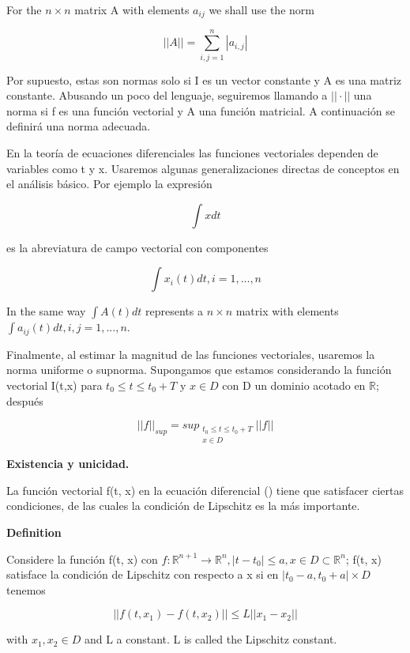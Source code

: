 \documentclass{beamer}
\begin{document}
\begin{frame}
For the $n \times n$ matrix A with elements $a_{ij}$ we shall use the norm

\[
||A|| = \sum_{i,j=1}^n |a_{i,j}|
\]

Por supuesto, estas son normas solo si I es un vector constante y A es una matriz constante. Abusando un poco del lenguaje, seguiremos llamando a $|| \cdot ||$ una norma si f es una función vectorial y A una función matricial. A continuación se definirá una norma adecuada.

En la teoría de ecuaciones diferenciales las funciones vectoriales dependen de variables como t y x. Usaremos algunas generalizaciones directas de conceptos en el análisis básico. Por ejemplo la expresión


\end{frame}

\begin{frame}
\[
\int x dt
\]

es la abreviatura de campo vectorial con componentes

\[
\int x_i(t) dt, i=1,...,n
\]

In the same way $\int A(t) dt$ represents a $n \times n$ matrix with elements $\int a_{ij}(t) dt, i,j=1,...,n$.

Finalmente, al estimar la magnitud de las funciones vectoriales, usaremos la norma uniforme o supnorma. Supongamos que estamos considerando la función vectorial I(t,x) para $t_0 \leq t \leq t_0+T$ y $x \in D$ con D un dominio acotado en $\mathbb{R}$; después

\end{frame}

\begin{frame}
\[
||f||_{sup} = sup_{\begin{matrix}
t_0 \leq t \leq t_0+T\\ 
x \in D

\end{matrix}} ||f||
\]

\end{frame}

\begin{frame}

\textbf{Existencia y unicidad.}

\hfill

La función vectorial f(t, x) en la ecuación diferencial (\cite{uno:uno}) tiene que satisfacer ciertas condiciones, de las cuales la condición de Lipschitz es la más importante.

\hfill

\textbf{Definition}

\hfill

Considere la función f(t, x) con $f: \mathbb{R}^{n+1} \rightarrow \mathbb{R}^{n}, |t-t_0| \leq a, x \in D \subset \mathbb{R}^{n}$; f(t, x) satisface la condición de Lipschitz con respecto a x si en $|t_0-a, t_0+a| \times D$ tenemos

\[
||f(t, x_1) - f(t,x_2)|| \leq L ||x_1 - x_2||
\]

with $x_1, x_2 \in D$  and L a constant. L is called the Lipschitz constant.

\end{frame}
\end{document}
